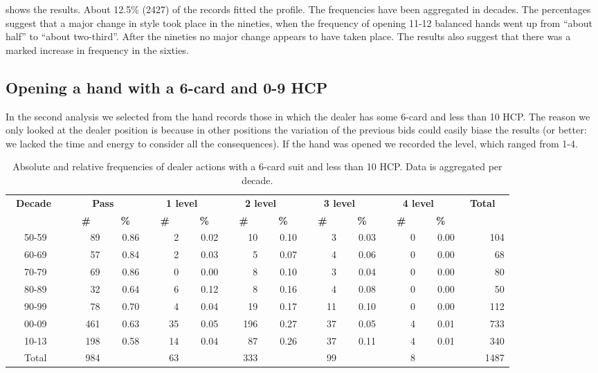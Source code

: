 \documentclass{llncs}
\begin{document}
 shows the results. About 12.5\% (2427)  of the
records fitted the profile. The frequencies have
been aggregated in decades.   The percentages
suggest that a major change in style took place in the nineties, when the
frequency of opening 11-12 balanced hands went up from ``about half''
to ``about two-third''. After the nineties no major change appears to have
taken place.  The results also suggest that there was a marked
increase in frequency in the sixties.  
 
\subsection{Opening a hand with a  6-card and 0-9 HCP}

In the second analysis we selected from the hand records those in
which the dealer has some 6-card and less than 10 HCP. The reason we
only looked at the dealer position is because in other positions the
variation of the previous bids could easily biase the results (or
better: we lacked the time and energy to consider all the
consequences).  If the hand was opened we recorded the level, which
ranged from 1-4.  

\begin{table}
\caption{Absolute and relative frequencies of dealer actions with a
  6-card suit and less than 10 HCP. Data is aggregated per decade.}
\label{tbl:weak-two-1st}
\centering
\begin{tabular}{|c|r|r|r|r|r|r|r|r|r|r|r|}
\hline
\bf \ Decade \ & 
\multicolumn{2}{|c|}{\bf \ Pass \ }  &
\multicolumn{2}{|c|}{\bf \ 1 level \ } &
\multicolumn{2}{|c|}{\bf \ 2 level \ } &
\multicolumn{2}{|c|}{\bf \ 3 level \ } &
\multicolumn{2}{|c|}{\bf \ 4 level \ } &
\bf \ Total \  \\ 
\cline{2-11} &
\bf \ \ \# \ &\bf \ \ \% \ &
\bf \ \ \# \ &\bf \ \ \% \ &
\bf \ \ \# \ &\bf \ \ \% \ &
\bf \ \ \# \ &\bf \ \ \% \ &
\bf \ \ \# \ &\bf \ \ \% \ &
\\ \hline\hline
50-59& 89&0.86&2&0.02&10&0.10&3&0.03&0&0.00&104 \\ \hline
60-69& 57&0.84&2&0.03&5&0.07&4&0.06&0&0.00&68 \\ \hline
70-79& 69&0.86&0&0.00&8&0.10&3&0.04&0&0.00&80 \\ \hline
80-89& 32&0.64&6&0.12&8&0.16&4&0.08&0&0.00&50 \\ \hline
90-99& 78&0.70&4&0.04&19&0.17&11&0.10&0&0.00&112 \\ \hline
00-09&461&0.63&35&0.05&196&0.27&37&0.05&4&0.01&733 \\ \hline
10-13&198&0.58&14&0.04&87&0.26&37&0.11&4&0.01&340 \\ \hline
Total &984&&63&&333&&99&&8&&1487 \\ \hline
\end{tabular}
\end{table}
\end{document}
